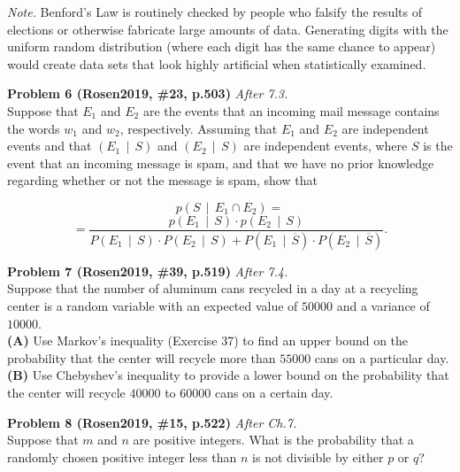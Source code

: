 \documentclass[jou]{apa6}
\begin{document}
{\em Note.} Benford's Law is routinely checked by people who falsify the results of elections 
or otherwise fabricate large amounts of data. 
Generating digits with the uniform random distribution (where each 
digit has the same chance to appear) would create data sets that look highly artificial
when statistically examined.

\vspace{8pt}
{\bf Problem 6 (Rosen2019, \#23, p.503)} \textendash{} {\em After 7.3.}\\
Suppose that $E_1$ and $E_2$ are the events that an incoming mail message contains the words
$w_1$ and $w_2$, respectively. 
Assuming that $E_1$ and $E_2$ are independent events and that $(E_1 \,\mid\, S)$ 
and $(E_2 \,\mid\, S)$ are independent events, 
where $S$ is the event that an incoming message is spam, and that we have 
no prior knowledge regarding whether or not the message is spam, show that


$$p\left( S \,\mid\, E_1 \cap E_2 \right) =$$
$$= \frac{p(E_1 \,\mid\, S) \cdot p(E_2 \,\mid\, S)}{P(E_1 \,\mid\, S) \cdot P(E_2 \,\mid\, S)
+ P(E_1 \,\mid\, \overline{S} ) \cdot P(E_2 \,\mid\, \overline{S} )}.$$

\vspace{8pt}
{\bf Problem 7 (Rosen2019, \#39, p.519)} \textendash{} {\em After 7.4.}\\
Suppose that the number of aluminum cans recycled in a day at a recycling center
is a random variable with an expected value of $50000$ and a variance of $10000$.\\
{\bf (A)} Use Markov's inequality (Exercise 37) to find an upper bound 
on the probability that the center will recycle more than $55000$ cans on a particular day.\\
{\bf (B)} Use Chebyshev's inequality to provide a lower bound on the probability that the center
will recycle $40000$ to $60000$ cans on a certain day.

\vspace{8pt}
{\bf Problem 8 (Rosen2019, \#15, p.522)} \textendash{} {\em After Ch.7.}\\
Suppose that $m$ and $n$ are positive integers. What is the probability that 
a randomly chosen positive integer less than $n$ is not divisible by either $p$ or $q$? 
\end{document}

